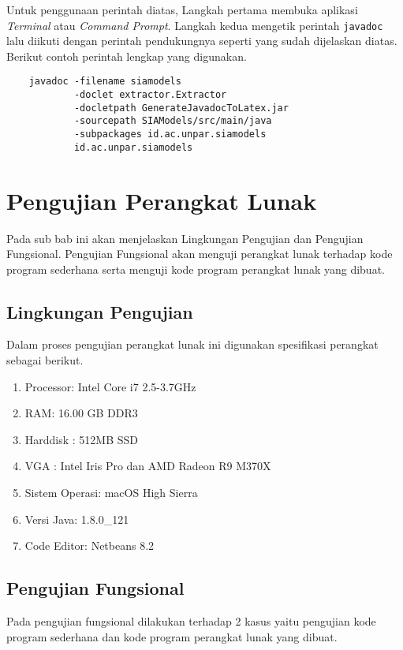 Untuk penggunaan perintah diatas, Langkah pertama membuka aplikasi {\it Terminal} atau {\it Command Prompt}. Langkah kedua mengetik perintah {\tt javadoc} lalu diikuti dengan perintah pendukungnya seperti yang sudah dijelaskan diatas. Berikut contoh perintah lengkap yang digunakan.

\begin{verbatim}
	javadoc -filename siamodels
	        -doclet extractor.Extractor
	        -docletpath GenerateJavadocToLatex.jar
	        -sourcepath SIAModels/src/main/java
	        -subpackages id.ac.unpar.siamodels
	        id.ac.unpar.siamodels
\end{verbatim}

\section{Pengujian Perangkat Lunak}
\label{sec: pengujian perangkat lunak}
Pada sub bab ini akan menjelaskan Lingkungan Pengujian dan Pengujian Fungsional. Pengujian Fungsional akan menguji perangkat lunak terhadap kode program sederhana serta menguji kode program perangkat lunak yang dibuat.
\subsection{Lingkungan Pengujian}
\label{sec:lingkungan perangkat lunak}
Dalam proses pengujian perangkat lunak ini digunakan spesifikasi perangkat sebagai berikut.

\begin{enumerate}
	\item Processor: Intel Core i7 2.5-3.7GHz 
	\item RAM: 16.00 GB DDR3	
	\item Harddisk : 512MB SSD
	\item VGA : Intel Iris Pro dan AMD Radeon R9 M370X
	\item Sistem Operasi: macOS High Sierra
	\item Versi Java: 1.8.0\_121
	\item Code Editor: Netbeans 8.2
\end{enumerate}

\subsection{Pengujian Fungsional}
\label{sec:pengujian fungsional}
Pada pengujian fungsional dilakukan terhadap 2 kasus yaitu pengujian kode program sederhana dan kode program perangkat lunak yang dibuat.

